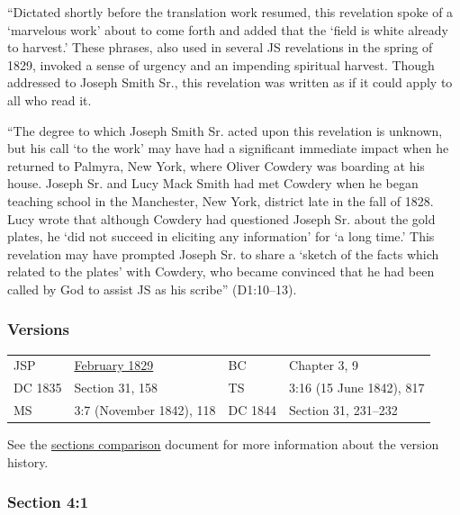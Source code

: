 			``Dictated shortly before the translation work resumed, this revelation spoke of a `marvelous work' about to come forth and added that the `field is white already to harvest.' These phrases, also used in several JS revelations in the spring of 1829, invoked a sense of urgency and an impending spiritual harvest. Though addressed to Joseph Smith Sr., this revelation was written as if it could apply to all who read it.
			
			``The degree to which Joseph Smith Sr. acted upon this revelation is unknown, but his call `to the work' may have had a significant immediate impact when he returned to Palmyra, New York, where Oliver Cowdery was boarding at his house. Joseph Sr. and Lucy Mack Smith had met Cowdery when he began teaching school in the Manchester, New York, district late in the fall of 1828. Lucy wrote that although Cowdery had questioned Joseph Sr. about the gold plates, he `did not succeed in eliciting any information' for `a long time.' This revelation may have prompted Joseph Sr. to share a `sketch of the facts which related to the plates' with Cowdery, who became convinced that he had been called by God to assist JS as his scribe'' (D1:10--13).
		
	\subsubsection{Versions}
		\label{DC4-V}
	
		\begin{tabular}{p{1in}p{2in}p{1in}p{2in}}
			JSP		& \hyperref[EMS-1828-1829-JS-FEB-1829]{February 1829}	& BC		& Chapter 3, 9 \\
			DC 1835 & Section 31, 158										& TS		& 3:16 (15 June 1842), 817 \\
			MS		& 3:7 (November 1842), 118								& DC 1844	& Section 31, 231--232 \\
		\end{tabular}
		
		\medskip
		
		See the \href{https://drive.google.com/file/d/1goAvNz8jS4R8slYfMG_db55Ty2z_vmgK/view?usp=sharing}{sections comparison} document for more information about the version history.

	\subsubsection{Section 4:1} %
		\label{DC4-1}

